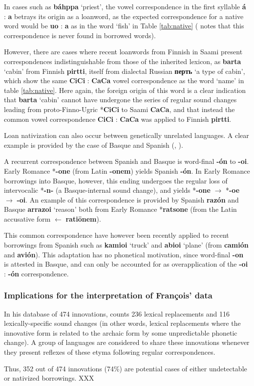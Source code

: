\documentclass[oneside,a4paper,11pt]{article}
\newcommand{\ipa}[1]{\textbf{{\phon\mbox{#1}}}}
\begin{document}
In cases such as \ipa{báhppa} `priest', the vowel correspondence in the first syllable \ipa{á} : \ipa{a} betrays its origin as a loanword, as the expected correspondence for a native word would be \ipa{uo} : \ipa{a} as in the word `fish' in Table \ref{tab:native} (\citealt[35]{aikio06nativization} notes that this correspondence is never found in borrowed words).

However, there are cases where recent loanwords from Finnish in Saami present correspondences indistinguishable from those of the inherited lexicon, as \ipa{barta} `cabin' from Finnish \ipa{pirtti}, itself from dialectal Russian \ipa{перть} `a type of cabin', which show the same \ipa{CiCi} : \ipa{CaCa} vowel correspondence as the word `name' in table \ref{tab:native}. Here again, the foreign origin of this word is a clear indication that \ipa{barta} `cabin' cannot have undergone the series of regular sound changes leading from proto-Finno-Ugric *\ipa{CiCi} to Saami \ipa{CaCa}, and that instead the common vowel correspondence \ipa{CiCi} : \ipa{CaCa} was applied to Finnish \ipa{pirtti}.

 
Loan nativization can also occur between genetically unrelated languages. A clear example is provided by the case of Basque and Spanish (\citealt[53-54]{trask00chronology}, \citealt[21-3]{aikio06nativization}). 

A recurrent correspondence between Spanish and Basque is word-final \ipa{-ón} to \ipa{-oi}. Early Romance *\ipa{-one} (from Latin \ipa{-onem}) yields Spanish \ipa{-ón}. In Early Romance borrowings into Basque, however, this ending undergoes the regular loss of intervocalic *\ipa{-n-} (a Basque-internal sound change), and yields *\ipa{-one} $\rightarrow$ *\ipa{-oe} $\rightarrow$ \ipa{-oi}. An example of this correspondence is provided by Spanish \ipa{razón} and Basque \ipa{arrazoi} `reason' both from Early Romance *\ipa{ratsone} (from the Latin accusative form $\leftarrow$ \ipa{ratiōnem}).

This common correspondence have however been recently applied to recent borrowings from Spanish such as \ipa{kamioi} `truck' and \ipa{abioi} `plane' (from \ipa{camión} and \ipa{avión}). This adaptation has no phonetical motivation, since word-final \ipa{-on} is attested in Basque, and can only be accounted for as overapplication of the \ipa{-oi} : \ipa{-ón} correspondence.



\subsubsection{Implications for the interpretation of François' data}
In his database of 474 innovations, \citet[177]{francois15tree} counts 236 lexical replacements and 116 lexically-specific sound changes (in other words, lexical replacements where the innovative form is related to the archaic form by some unpredictable phonetic change). A group of languages are considered to share these innovations whenever they present reflexes of these etyma following regular correspondences.

Thus, 352 out of 474 innovations (74\%) are potential cases of either undetectable or nativized borrowings. XXX





 
\end{document}
